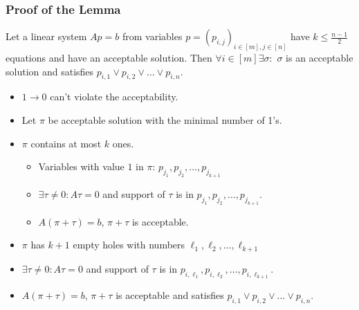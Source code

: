 \begin{frame}
    \frametitle{Proof of the Lemma}

    \begin{lemma}
    	Let a linear system $Ap = b$ from variables
	    $p = (p_{i, j})_{i \in [m], j \in [n]}$ have $k \le \frac{n - 1}{2}$
	    equations and have an acceptable solution. Then  $\forall i \in [m] \exists
        \sigma:$ $\sigma$ is an acceptable solution and satisfies $p_{i, 1} \lor
        p_{i, 2} \lor \dots \lor p_{i,n}$.
    \end{lemma}
    
    \pause
	\begin{itemize}
		\item $1 \to 0$ can't violate the acceptability.
    	\pause
		\item Let $\pi$ be acceptable solution with the minimal number of 1's.
	    \pause
		\item $\pi$ contains at most $k$ ones.
	    	\pause
			\begin{itemize}
				\item Variables with value $1$ in $\pi$: $p_{j_1}, p_{j_2}, \dots,
	                p_{j_{k + 1}}$ 
				\item $\exists \tau \neq 0: A \tau = 0$ and support of $\tau$ is in
		            $p_{j_1}, p_{j_2}, \dots, p_{j_{k + 1}}$. 
				\item $A(\pi + \tau) = b$, $\pi + \tau$ is acceptable.
			\end{itemize}
        \pause
		\item $\pi$ has $k + 1$ empty holes with numbers $\ell_1, \ell_2, \dots,
    		\ell_{k + 1}$
        \pause
		\item $\exists \tau \neq 0: A \tau = 0$ and support of $\tau$ is in
    		$p_{i, \ell_1}, p_{i, \ell_2}, \dots, p_{i, \ell_{k + 1}}$.
		\item $A(\pi + \tau) = b$, $\pi + \tau$ is acceptable and satisfies $p_{i, 1}
		    \lor p_{i, 2} \lor \dots \lor p_{i,n}$.
	\end{itemize}
\end{frame}




